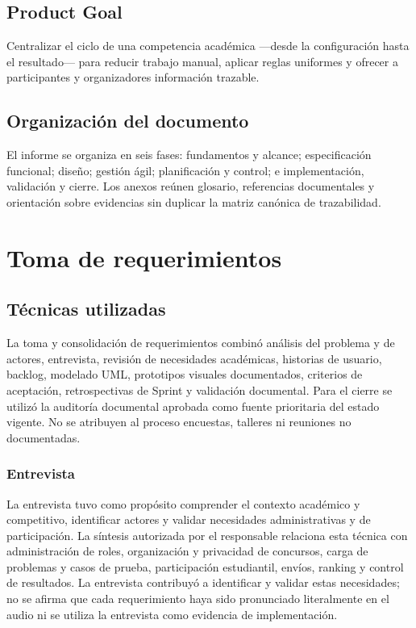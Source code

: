 \documentclass[11pt,a4paper]{article}
\begin{document}
\subsection{Product Goal}
Centralizar el ciclo de una competencia académica ---desde la configuración hasta el resultado--- para reducir trabajo manual, aplicar reglas uniformes y ofrecer a participantes y organizadores información trazable.

\subsection{Organización del documento}
El informe se organiza en seis fases: fundamentos y alcance; especificación funcional; diseño; gestión ágil; planificación y control; e implementación, validación y cierre. Los anexos reúnen glosario, referencias documentales y orientación sobre evidencias sin duplicar la matriz canónica de trazabilidad.

\section{Toma de requerimientos}

\subsection{Técnicas utilizadas}
La toma y consolidación de requerimientos combinó análisis del problema y de actores, entrevista, revisión de necesidades académicas, historias de usuario, backlog, modelado UML, prototipos visuales documentados, criterios de aceptación, retrospectivas de Sprint y validación documental. Para el cierre se utilizó la auditoría documental aprobada como fuente prioritaria del estado vigente. No se atribuyen al proceso encuestas, talleres ni reuniones no documentadas.

\subsubsection{Entrevista}
La entrevista tuvo como propósito comprender el contexto académico y competitivo, identificar actores y validar necesidades administrativas y de participación. La síntesis autorizada por el responsable relaciona esta técnica con administración de roles, organización y privacidad de concursos, carga de problemas y casos de prueba, participación estudiantil, envíos, ranking y control de resultados. La entrevista contribuyó a identificar y validar estas necesidades; no se afirma que cada requerimiento haya sido pronunciado literalmente en el audio ni se utiliza la entrevista como evidencia de implementación.
\end{document}

